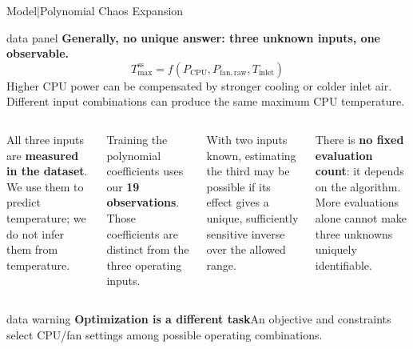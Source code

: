 \begin{frame}{Model\enspace|\enspace Polynomial Chaos Expansion}
  \begin{beamercolorbox}[sep=2mm,wd=\textwidth]{data panel}
    \footnotesize
    \textbf{Generally, no unique answer: three unknown inputs, one observable.}
    \[
      T_{\max}^{\mathrm{ss}}
      = f(P_{\mathrm{CPU}},P_{\mathrm{fan,raw}},T_{\mathrm{inlet}})
    \]
    Higher CPU power can be compensated by stronger cooling or colder inlet air.
    Different input combinations can produce the same maximum CPU temperature.
  \end{beamercolorbox}
  \medskip
  \begin{columns}[T,onlytextwidth]
      \footnotesize
      All three inputs are \textbf{measured in the dataset}. We use them to predict
      temperature; we do not infer them from temperature.\par
      \smallskip
      Training the polynomial coefficients uses our \textbf{19 observations}.
      Those coefficients are distinct from the three operating inputs.

      \footnotesize
      With two inputs known, estimating the third may be possible if its effect
      gives a unique, sufficiently sensitive inverse over the allowed range.\par
      \smallskip
      There is \textbf{no fixed evaluation count}: it depends on the algorithm.
      More evaluations alone cannot make three unknowns uniquely identifiable.
  \end{columns}
  \medskip
  \begin{beamercolorbox}[sep=1.5mm,wd=\textwidth]{data warning}
    \footnotesize
    \textbf{Optimization is a different task}\quad An objective and constraints
    select CPU/fan settings among possible operating combinations.
  \end{beamercolorbox}
\end{frame}

